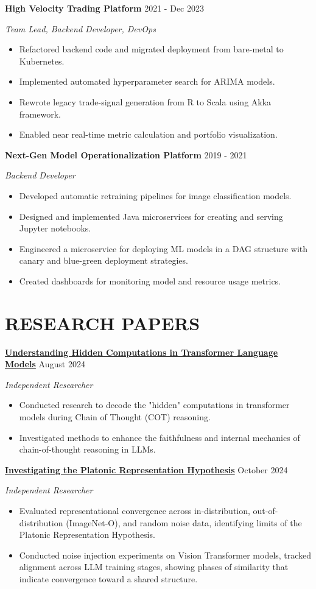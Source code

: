 \documentclass[fontsize=11pt]{article}
\newcommand{\sepspace}{\vspace*{1em}}
\newcommand{\NewPart}[1]{\section*{\uppercase{#1}}}
\newcommand{\ProjectEntry}[4]{
    \noindent \textbf{#1} \hfill {#2} \par
    \noindent \textit{#3} \par
    \noindent \small #4
    \normalsize \par}
\begin{document}
\sepspace
\ProjectEntry{High Velocity Trading Platform}{2021 - Dec 2023}{Team Lead, Backend Developer, DevOps}
{%
\begin{itemize}
\item Refactored backend code and migrated deployment from bare-metal to Kubernetes.
\item Implemented automated hyperparameter search for ARIMA models.
\item Rewrote legacy trade-signal generation from R to Scala using Akka framework.
\item Enabled near real-time metric calculation and portfolio visualization.
\end{itemize}}

\sepspace
\ProjectEntry{Next-Gen Model Operationalization Platform}{2019 - 2021}{Backend Developer}
{%
\begin{itemize}
\item Developed automatic retraining pipelines for image classification models.
\item Designed and implemented Java microservices for creating and serving Jupyter notebooks.
\item Engineered a microservice for deploying ML models in a DAG structure with canary and blue-green deployment strategies.
\item Created dashboards for monitoring model and resource usage metrics.
\end{itemize}}

\NewPart{RESEARCH PAPERS}

\ProjectEntry{\href{https://github.com/rokosbasilisk/filler_tokens/blob/v2/paper.pdf}{Understanding Hidden Computations in Transformer Language Models}}{August 2024}{Independent Researcher}
{%
\begin{itemize}
\item Conducted research to decode the "hidden" computations in transformer models during Chain of Thought (COT) reasoning.
\item Investigated methods to enhance the faithfulness and internal mechanics of chain-of-thought reasoning in LLMs.
\end{itemize}}

\sepspace
\ProjectEntry{\href{https://github.com/rokosbasilisk/platonic-rep/blob/main/paper/prh_paper.pdf}{Investigating the Platonic Representation Hypothesis}}{October 2024}{Independent Researcher}
{%
\begin{itemize}
\item Evaluated representational convergence across in-distribution, out-of-distribution (ImageNet-O), and random noise data, identifying limits of the Platonic Representation Hypothesis. 
\item Conducted noise injection experiments on Vision Transformer models, tracked alignment across LLM training stages, showing phases of similarity that indicate convergence toward a shared structure.
\end{itemize}}
\end{document}
